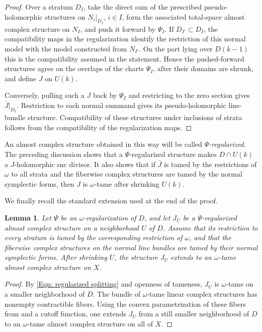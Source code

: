 \documentclass[11pt]{amsart}
\numberwithin{equation}{section}
\theoremstyle{plain}
\newtheorem{lemma}[theorem]{Lemma}
\theoremstyle{definition}
\begin{document}
\begin{proof}
Over a stratum $D_I$, take the direct sum of the prescribed
pseudo-holomorphic structures on $N_i|_{D_I}$, $i\in I$, form the associated
total-space almost complex structure on $N_I$, and push it forward by
$\Psi_I$. If $D_{I'}\subset D_I$, the compatibility maps in the regularization
identify the restriction of this normal model with the model constructed from
$N_{I'}$. On the part lying over $D(k-1)$ this is the compatibility assumed in
the statement. Hence the pushed-forward structures agree on the overlaps of
the charts $\Psi_I$, after their domains are shrunk, and define $J$ on
$U(k)$.

Conversely, pulling such a $J$ back by $\Psi_I$ and restricting to the zero
section gives $\bar J|_{D_I}$. Restriction to each normal summand gives its
pseudo-holomorphic line-bundle structure. Compatibility of these structures
under inclusions of strata follows from the compatibility of the
regularization maps.
\end{proof}

An almost complex structure obtained in this way will be called
\emph{$\Psi$-regularized}. The preceding discussion shows that a
$\Psi$-regularized structure makes $D\cap U(k)$ a $J$-holomorphic snc divisor.
It also shows that if $\bar J$ is tamed by the restrictions of $\omega$ to all
strata and the fiberwise complex structures are tamed by the normal symplectic
forms, then $J$ is $\omega$-tame after shrinking $U(k)$.

We finally recall the standard extension used at the end of the proof.

\begin{lemma}
\label{Lem: Extension of J from divisor}
Let $\Psi$ be an $\omega$-regularization of $D$, and let $J_U$ be a
$\Psi$-regularized almost complex structure on a neighborhood $U$ of $D$.
Assume that its restriction to every stratum is tamed by the corresponding
restriction of $\omega$, and that the fiberwise complex structures on the
normal line bundles are tamed by their normal symplectic forms. After shrinking
$U$, the structure $J_U$ extends to an $\omega$-tame almost complex structure
on $X$.
\end{lemma}

\begin{proof}
By \eqref{Eqn: regularized splitting} and openness of tameness, $J_U$ is
$\omega$-tame on a smaller neighborhood of $D$. The bundle of
$\omega$-tame linear complex structures has nonempty contractible fibers.
Using the convex parametrization of these fibers from
\cite[Prop.\,2.5.13, Proof~3]{McDuffSalamon} and a cutoff function,
one extends $J_U$ from a still smaller neighborhood of $D$ to an
$\omega$-tame almost complex structure on all of $X$.
\end{proof}
\end{document}
